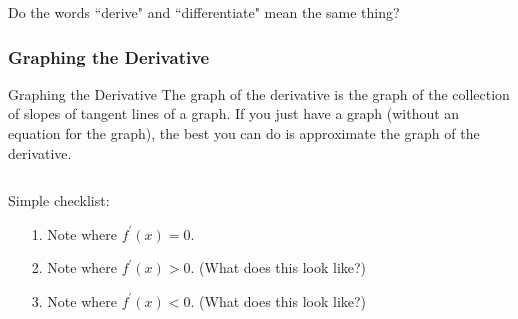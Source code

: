 \documentclass[cal1spr16Lectures.tex]{subfiles}
\begin{document}
\begin{frame}
\begin{que}
Do the words ``derive" and ``differentiate" mean the same thing?
\end{que}
\end{frame}

\subsubsection{Graphing the Derivative}

\begin{frame}{\small Graphing the Derivative}
The graph of the derivative is the graph of the collection of slopes of tangent lines of a graph.  If you just have a graph (without an equation for the graph), the best you can do is approximate the graph of the derivative.
\end{frame}

\begin{frame}\footnotesize
\begin{ex}
\vspace{0.75pc}
\begin{columns}[T]
\begin{column}{0.45\textwidth}
	Simple checklist:
	\begin{itemize}
	\item[1.] Note where $f^{\prime}(x)=0$.
	\item[2.]  Note where $f^{\prime}(x)>0$.  (What does this look like?)
	\item[3.]  Note where $f^{\prime}(x)<0$.  (What does this look like?)
	\end{itemize}
\end{column}
\begin{column}{0.5\textwidth}	
\end{column}
\end{columns}
\end{ex}	
\end{frame}
\end{document}
